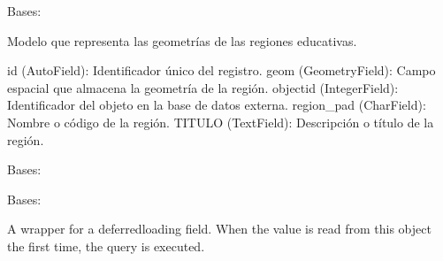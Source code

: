 \documentclass[letterpaper,10pt,spanish]{sphinxmanual}
\begin{document}
\begin{fulllineitems}

\pysigstartsignatures
{}
\pysigstopsignatures
\sphinxAtStartPar
Bases: 

\sphinxAtStartPar
Modelo que representa las geometrías de las regiones educativas.
\begin{description}
\sphinxAtStartPar
id (AutoField): Identificador único del registro.
geom (GeometryField): Campo espacial que almacena la geometría de la región.
objectid (IntegerField): Identificador del objeto en la base de datos externa.
region\_pad (CharField): Nombre o código de la región.
TITULO (TextField): Descripción o título de la región.

\end{description}


\begin{fulllineitems}

\pysigstartsignatures
{}
\pysigstopsignatures
\sphinxAtStartPar
Bases: 

\end{fulllineitems}



\begin{fulllineitems}

\pysigstartsignatures
{}
\pysigstopsignatures
\sphinxAtStartPar
Bases: 

\end{fulllineitems}



\begin{fulllineitems}

\pysigstartsignatures
{}
\pysigstopsignatures
\sphinxAtStartPar
A wrapper for a deferred\sphinxhyphen{}loading field. When the value is read from this
object the first time, the query is executed.


\end{fulllineitems}
\end{fulllineitems}
\end{document}
